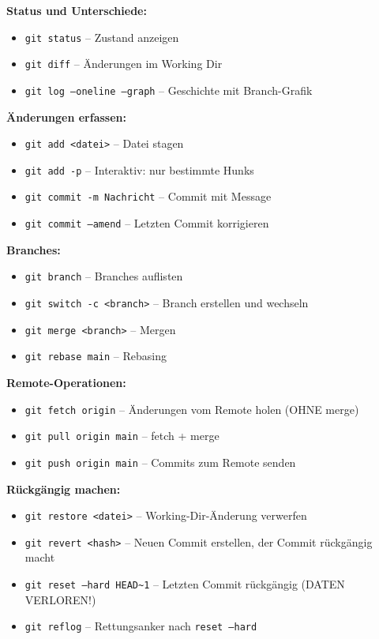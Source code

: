 \textbf{Status und Unterschiede:}
\begin{itemize}
  \item \texttt{git status} -- Zustand anzeigen
  \item \texttt{git diff} -- Änderungen im Working Dir
  \item \texttt{git log --oneline --graph} -- Geschichte mit Branch-Grafik
\end{itemize}

\textbf{Änderungen erfassen:}
\begin{itemize}
  \item \texttt{git add <datei>} -- Datei stagen
  \item \texttt{git add -p} -- Interaktiv: nur bestimmte Hunks
  \item \texttt{git commit -m Nachricht} -- Commit mit Message
  \item \texttt{git commit --amend} -- Letzten Commit korrigieren
\end{itemize}

\textbf{Branches:}
\begin{itemize}
  \item \texttt{git branch} -- Branches auflisten
  \item \texttt{git switch -c <branch>} -- Branch erstellen und wechseln
  \item \texttt{git merge <branch>} -- Mergen
  \item \texttt{git rebase main} -- Rebasing
\end{itemize}

\textbf{Remote-Operationen:}
\begin{itemize}
  \item \texttt{git fetch origin} -- Änderungen vom Remote holen (OHNE merge)
  \item \texttt{git pull origin main} -- fetch + merge
  \item \texttt{git push origin main} -- Commits zum Remote senden
\end{itemize}

\textbf{Rückgängig machen:}
\begin{itemize}
  \item \texttt{git restore <datei>} -- Working-Dir-Änderung verwerfen
  \item \texttt{git revert <hash>} -- Neuen Commit erstellen, der Commit rückgängig macht
  \item \texttt{git reset --hard HEAD\textasciitilde 1} -- Letzten Commit rückgängig (DATEN VERLOREN!)
  \item \texttt{git reflog} -- Rettungsanker nach \texttt{reset --hard}
\end{itemize}

